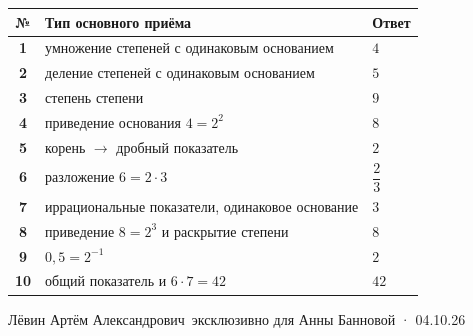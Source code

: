 \documentclass[a4paper,12pt]{article}
\newcommand{\lessondate}{04.10.26}
\newcommand{\teacher}{Лёвин Артём Александрович}
\begin{document}
\begin{center}
\begin{tabularx}{0.76\linewidth}{@{}>{\bfseries}c X >{\raggedleft\arraybackslash}p{32mm}@{}}
\toprule
№ & Тип основного приёма & Ответ \\
\midrule
1 & умножение степеней с одинаковым основанием & $4$ \\
2 & деление степеней с одинаковым основанием & $5$ \\
3 & степень степени & $9$ \\
4 & приведение основания $4=2^2$ & $8$ \\
5 & корень $\rightarrow$ дробный показатель & $2$ \\
6 & разложение $6=2\cdot3$ & $\dfrac23$ \\
7 & иррациональные показатели, одинаковое основание & $3$ \\
8 & приведение $8=2^3$ и раскрытие степени & $8$ \\
9 & $0{,}5=2^{-1}$ & $2$ \\
10 & общий показатель и $6\cdot7=42$ & $42$ \\
\bottomrule
\end{tabularx}
\end{center}

\vfill
\begin{center}
{\small\color{textgray}\teacher\ эксклюзивно для Анны Банновой · \lessondate}
\end{center}
\end{document}
